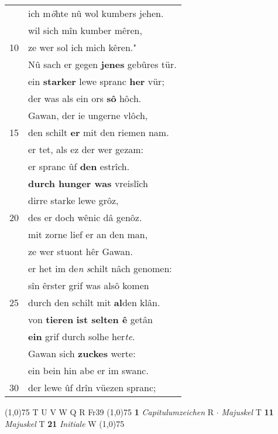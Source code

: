 \documentclass[8pt,a4paper,notitlepage]{article}
\begin{document}
\begin{table}[ht]
\begin{minipage}[t]{0.5\linewidth}
\begin{tabular}{rl}
 & ich m\textit{ö}hte nû wol kumbers jehen.\\ 
 & wil sich mîn kumber mêren,\\ 
10 & ze wer sol ich mich kêren."\\ 
 & Nû sach er gegen \textbf{jenes} gebûres tür.\\ 
 & ein \textbf{starker} lewe spranc \textbf{her} vür;\\ 
 & der was als ein ors \textbf{sô} hôch.\\ 
 & Gawan, der ie ungerne vlôch,\\ 
15 & den schilt \textbf{er} mit den riemen nam.\\ 
 & er tet, als ez der wer gezam:\\ 
 & er spranc ûf \textbf{den} estrîch.\\ 
 & \textbf{durch hunger was} vreislîch\\ 
 & dirre starke lewe grôz,\\ 
20 & des er doch wênic dâ genôz.\\ 
 & mit zorne lief er an den man,\\ 
 & ze wer stuont hêr Gawan.\\ 
 & er het im de\textit{n} \textit{s}chilt nâch genomen:\\ 
 & sîn êrster grif was alsô komen\\ 
25 & durch den schilt mit \textbf{al}den klân.\\ 
 & von \textbf{tieren} \textbf{ist selten ê} getân\\ 
 & \textbf{ein} grif durch solhe her\textit{te}.\\ 
 & Gawan sich \textbf{zuckes} werte:\\ 
 & ein bein hin abe er im swanc.\\ 
30 & der lewe ûf drîn vüezen spranc;\\ 
\end{tabular}
\scriptsize
\line(1,0){75} \newline
T U V W Q R Fr39 \newline
\line(1,0){75} \newline
\textbf{1} \textit{Capitulumzeichen} R   $\cdot$ \textit{Majuskel} T  \textbf{11} \textit{Majuskel} T  \textbf{21} \textit{Initiale} W  \newline
\line(1,0){75} \newline

\end{minipage}
\end{table}
\end{document}
